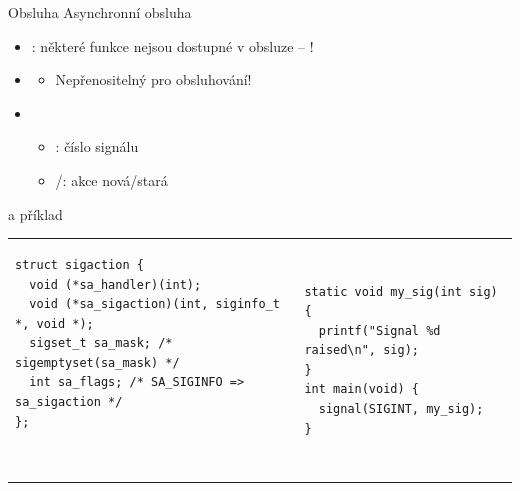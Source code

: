 \begin{frame}[fragile]{\ifpcdirlinux Obsluha \else Asynchronní obsluha \fi}

  \begin{itemize}
    \ifpcdirlinux
    \item \pozor: některé funkce nejsou dostupné v obsluze -- !

    \pause
    \fi

    \item {}
    \begin{itemize}
      \item Nepřenositelný pro obsluhování!
    \end{itemize}

    \pause

    \item {} \\
    \begin{itemize}
      \item {}: číslo signálu
      \item {}/: akce nová/stará
    \end{itemize}
  \end{itemize}

  \pause

  \begin{block}{ a příklad}
  \begin{tabular}{ll}
  \begin{lstlisting}
struct sigaction {
  void (*sa_handler)(int);
  void (*sa_sigaction)(int, siginfo_t *, void *);
  sigset_t sa_mask; /* sigemptyset(sa_mask) */
  int sa_flags; /* SA_SIGINFO => sa_sigaction */
};
  \end{lstlisting}~
  & \pause
  \begin{lstlisting}
static void my_sig(int sig) {
  printf("Signal %d raised\n", sig);
}
int main(void) {
  signal(SIGINT, my_sig);
}
  \end{lstlisting}
  \end{tabular}
  \end{block}

\end{frame}

